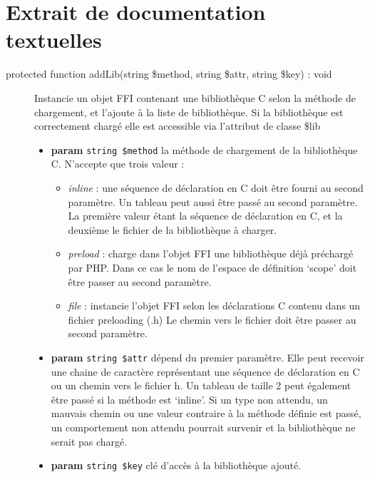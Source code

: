 \documentclass[11pt,a4paper,krantz2,11pt,oneside]{krantz}
\providecommand{\tightlist}{%
  \setlength{\itemsep}{0pt}\setlength{\parskip}{0pt}}
\begin{document}
\hypertarget{extrait-de-documentation-textuelles}{%
\section{Extrait de documentation textuelles}\label{extrait-de-documentation-textuelles}}

\begin{description}
\item[protected function addLib(string \$method, string \$attr, string \$key) : void]
Instancie un objet FFI contenant une bibliothèque C selon la méthode de chargement, et l'ajoute à la liste de bibliothèque. Si la bibliothèque est correctement chargé elle est accessible via l'attribut de classe \$lib

\begin{itemize}
\item
  \textbf{param} \texttt{string\ \$method} la méthode de chargement de la bibliothèque C. N'accepte que trois valeur :

  \begin{itemize}
  \tightlist
  \item
    \emph{inline} : une séquence de déclaration en C doit être fourni au second paramètre. Un tableau peut aussi être passé au second paramètre. La première valeur étant la séquence de déclaration en C, et la deuxième le fichier de la bibliothèque à charger.
  \item
    \emph{preload} : charge dans l'objet FFI une bibliothèque déjà préchargé par PHP. Dans ce cas le nom de l'espace de définition `scope' doit être passer au second paramètre.
  \item
    \emph{file} : instancie l'objet FFI selon les déclarations C contenu dans un fichier preloading (.h) Le chemin vers le fichier doit être passer au second paramètre.
  \end{itemize}
\item
  \textbf{param} \texttt{string\ \$attr} dépend du premier paramètre. Elle peut recevoir une chaine de caractère représentant une séquence de déclaration en C ou un chemin vers le fichier h. Un tableau de taille 2 peut également être passé si la méthode est `inline'. Si un type non attendu, un mauvais chemin ou une valeur contraire à la méthode définie est passé, un comportement non attendu pourrait survenir et la bibliothèque ne serait pas chargé.
\item
  \textbf{param} \texttt{string\ \$key} clé d'accès à la bibliothèque ajouté.
\end{itemize}
\end{description}



\printindex
\end{document}
